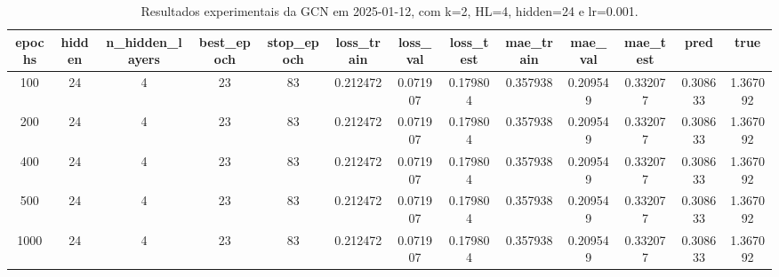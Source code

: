 \begin{table}[h]
\centering
\caption{Resultados experimentais da GCN em 2025-01-12, com k=2, HL=4, hidden=24 e lr=0.001.}
\label{tab:gcn_results_k2_hl4_h24_d20250112}
\begin{tabular}{ccccccccccccc}
\toprule
epochs & hidden & n\_hidden\_layers & best\_epoch & stop\_epoch & loss\_train & loss\_val & loss\_test & mae\_train & mae\_val & mae\_test & pred & true \\
\midrule
100 & 24 & 4 & 23 & 83 & 0.212472 & 0.071907 & 0.179804 & 0.357938 & 0.209549 & 0.332077 & 0.308633 & 1.367092 \\
200 & 24 & 4 & 23 & 83 & 0.212472 & 0.071907 & 0.179804 & 0.357938 & 0.209549 & 0.332077 & 0.308633 & 1.367092 \\
400 & 24 & 4 & 23 & 83 & 0.212472 & 0.071907 & 0.179804 & 0.357938 & 0.209549 & 0.332077 & 0.308633 & 1.367092 \\
500 & 24 & 4 & 23 & 83 & 0.212472 & 0.071907 & 0.179804 & 0.357938 & 0.209549 & 0.332077 & 0.308633 & 1.367092 \\
1000 & 24 & 4 & 23 & 83 & 0.212472 & 0.071907 & 0.179804 & 0.357938 & 0.209549 & 0.332077 & 0.308633 & 1.367092 \\
\bottomrule
\end{tabular}
\end{table}
